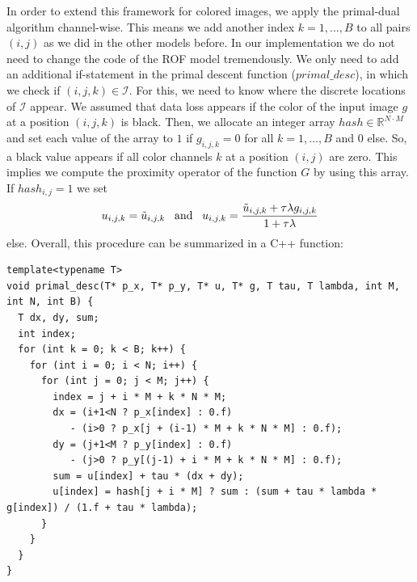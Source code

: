 \documentclass[abstracton]{scrreprt}
\begin{document}
        In order to extend this framework for colored images, we apply the primal-dual algorithm channel-wise. This means we add another index $k = 1, ..., B$ to all pairs $(i,j)$ as we did in the other models before. In our implementation we do not need to change the code of the ROF model tremendously. We only need to add an additional if-statement in the primal descent function ($primal\_desc$), in which we check if $(i,j,k) \in \mathcal{I}$. For this, we need to know where the discrete locations of $\mathcal{I}$ appear. We assumed that data loss appears if the color of the input image $g$ at a position $(i,j,k)$ is black. Then, we allocate an integer array $hash \in \mathbb{R}^{N \cdot M}$ and set each value of the array to $1$ if $g_{i,j,k} = 0$ for all $k = 1, ..., B$ and $0$ else. So, a black value appears if all color channels $k$ at a position $(i,j)$ are zero. This implies we compute the proximity operator of the function $G$ by using this array. If $hash_{i,j} = 1$ we set
            $$
                u_{i,j,k} = \tilde{u}_{i,j,k} \,\,\,\,\, \textnormal{and} \,\,\,\,\, u_{i,j,k} = \frac{\tilde{u}_{i,j,k} + \tau \lambda g_{i,j,k}}{1 + \tau\lambda}
            $$
        else. Overall, this procedure can be summarized in a C++ function:
        \begin{lstlisting}
template<typename T>
void primal_desc(T* p_x, T* p_y, T* u, T* g, T tau, T lambda, int M, int N, int B) {
  T dx, dy, sum;
  int index;
  for (int k = 0; k < B; k++) {
    for (int i = 0; i < N; i++) {
      for (int j = 0; j < M; j++) {
        index = j + i * M + k * N * M;
        dx = (i+1<N ? p_x[index] : 0.f)
           - (i>0 ? p_x[j + (i-1) * M + k * N * M] : 0.f);
        dy = (j+1<M ? p_y[index] : 0.f)
           - (j>0 ? p_y[(j-1) + i * M + k * N * M] : 0.f);
        sum = u[index] + tau * (dx + dy);
        u[index] = hash[j + i * M] ? sum : (sum + tau * lambda * g[index]) / (1.f + tau * lambda);
      }
    }
  }
}
        \end{lstlisting}
\end{document}
